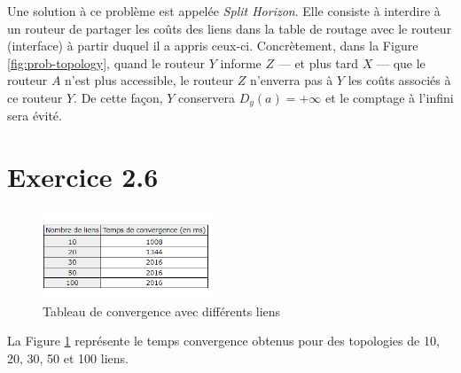 \documentclass[11pt]{article}
\begin{document}
Une solution à ce problème est appelée \textit{Split Horizon}. Elle consiste à interdire à un routeur de partager les coûts des liens dans la table de routage avec le routeur (interface) à partir duquel il a appris ceux-ci. Concrètement, dans la Figure \ref{fig:prob-topology}, quand le routeur $Y$ informe $Z$ --- et plus tard $X$ --- que le routeur $A$ n'est plus accessible, le routeur $Z$ n'enverra pas à $Y$ les coûts associés à ce routeur $Y$. De cette façon, $Y$ conservera $D_{y}(a)=+\infty$ et le comptage à l'infini sera évité.



\section{Exercice 2.6}
\begin{figure} [h!]
\centering
  \includegraphics[width=0.45\textwidth]{../documents/convergence-graphs.png}
  \caption{Tableau de convergence avec différents liens}
   \label{fig:graphs}
\end{figure}
La Figure \ref{fig:graphs} représente le temps convergence obtenus pour des topologies de 10, 20, 30, 50 et 100 liens.
\vspace{10px}
\begin{center}
\end{center}

\vspace*{\fill}
\end{document}
